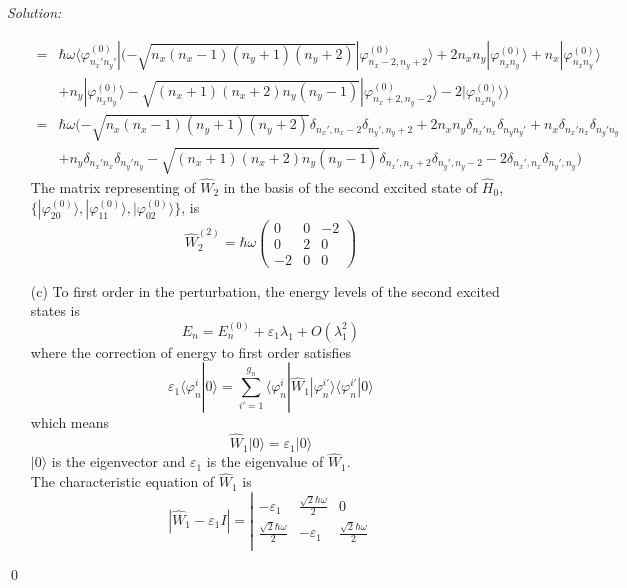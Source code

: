 \documentclass[10pt,a4paper]{article}
\newenvironment{sol}
    {\emph{Solution:}
    }
    {
    \qed
    }
\begin{document}
\begin{sol}
\begin{itemize}
\begin{align}
\nonumber=&\hbar\omega\langle\varphi_{n_x'n_y'}^{(0)}|(-\sqrt{n_x(n_x-1)(n_y+1)(n_y+2)}|\varphi_{n_x-2,n_y+2}^{(0)}\rangle+2n_xn_y|\varphi_{n_xn_y}^{(0)}\rangle+n_x|\varphi_{n_xn_y}^{(0)}\rangle\\
\nonumber&+n_y|\varphi_{n_xn_y}^{(0)}\rangle-\sqrt{(n_x+1)(n_x+2)n_y(n_y-1)}|\varphi_{n_x+2,n_y-2}^{(0)}\rangle-2|\varphi_{n_xn_y}^{(0)}\rangle)\\
\nonumber=&\hbar\omega(-\sqrt{n_x(n_x-1)(n_y+1)(n_y+2)}\delta_{n_x',n_x-2}\delta_{n_y',n_y+2}+2n_xn_y\delta_{n_x'n_x}\delta_{n_yn_y'}+n_x\delta_{n_x'n_x}\delta_{n_y'n_y}\\
&+n_y\delta_{n_x'n_x}\delta_{n_y'n_y}-\sqrt{(n_x+1)(n_x+2)n_y(n_y-1)}\delta_{n_x',n_x+2}\delta_{n_y',n_y-2}-2\delta_{n_x',n_x}\delta_{n_y',n_y})
\end{align}
The matrix representing of $\hat{W}_2$ in the basis of the second excited state of $\hat{H}_0$, $\{|\varphi_{20}^{(0)}\rangle,|\varphi_{11}^{(0)}\rangle,|\varphi_{02}^{(0)}\rangle\}$, is
\begin{equation}
\hat{W}_2^{(2)}=\hbar\omega\left(\begin{array}{ccc}
0&0&-2\\
0&2&0\\
-2&0&0
\end{array}\right)
\end{equation}
\item[(c)] To first order in the perturbation, the energy levels of the second excited states is
\begin{equation}
E_n=E_n^{(0)}+\varepsilon_1\lambda_1+O(\lambda_1^2)
\end{equation}
where the correction of energy to first order satisfies
\begin{equation}
\varepsilon_1\langle\varphi_n^i|0\rangle=\sum_{i'=1}^{g_n}\langle\varphi_n^i|\hat{W}_1|\varphi_n^{i'}\rangle\langle\varphi_n^{i'}|0\rangle
\end{equation}
which means
\begin{equation}
\hat{W}_1|0\rangle=\varepsilon_1|0\rangle
\end{equation}
$|0\rangle$ is the eigenvector and $\varepsilon_1$ is the eigenvalue of $\hat{W}_1$.\\
The characteristic equation of $\hat{W}_1$ is
\begin{equation}
|\hat{W}_1-\varepsilon_1I|=\left|\begin{array}{ccc}
-\varepsilon_1&\frac{\sqrt{2}\hbar\omega}{2}&0\\
\frac{\sqrt{2}\hbar\omega}{2}&-\varepsilon_1&\frac{\sqrt{2}\hbar\omega}{2}\\

\end{array}
\end{equation}
\end{itemize}
\end{sol}
\end{document}

